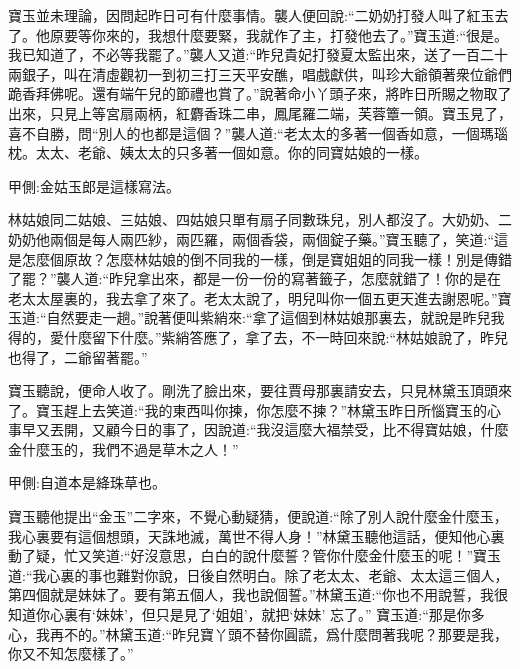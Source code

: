 \begin{parag}
    寶玉並未理論，因問起昨日可有什麼事情。襲人便回說:“二奶奶打發人叫了紅玉去了。他原要等你來的，我想什麼要緊，我就作了主，打發他去了。”寶玉道:“很是。我已知道了，不必等我罷了。”襲人又道:“昨兒貴妃打發夏太監出來，送了一百二十兩銀子，叫在清虛觀初一到初三打三天平安醮，唱戲獻供，叫珍大爺領著衆位爺們跪香拜佛呢。還有端午兒的節禮也賞了。”說著命小丫頭子來，將昨日所賜之物取了出來，只見上等宮扇兩柄，紅麝香珠二串，鳳尾羅二端，芙蓉簟一領。寶玉見了，喜不自勝，問“別人的也都是這個？”襲人道:“老太太的多著一個香如意，一個瑪瑙枕。太太、老爺、姨太太的只多著一個如意。你的同寶姑娘的一樣。\begin{note}甲側:金姑玉郎是這樣寫法。\end{note}林姑娘同二姑娘、三姑娘、四姑娘只單有扇子同數珠兒，別人都沒了。大奶奶、二奶奶他兩個是每人兩匹紗，兩匹羅，兩個香袋，兩個錠子藥。”寶玉聽了，笑道:“這是怎麼個原故？怎麼林姑娘的倒不同我的一樣，倒是寶姐姐的同我一樣！別是傳錯了罷？”襲人道:“昨兒拿出來，都是一份一份的寫著籤子，怎麼就錯了！你的是在老太太屋裏的，我去拿了來了。老太太說了，明兒叫你一個五更天進去謝恩呢。”寶玉道:“自然要走一趟。”說著便叫紫綃來:“拿了這個到林姑娘那裏去，就說是昨兒我得的，愛什麼留下什麼。”紫綃答應了，拿了去，不一時回來說:“林姑娘說了，昨兒也得了，二爺留著罷。”
\end{parag}


\begin{parag}
    寶玉聽說，便命人收了。剛洗了臉出來，要往賈母那裏請安去，只見林黛玉頂頭來了。寶玉趕上去笑道:“我的東西叫你揀，你怎麼不揀？”林黛玉昨日所惱寶玉的心事早又丟開，又顧今日的事了，因說道:“我沒這麼大福禁受，比不得寶姑娘，什麼金什麼玉的，我們不過是草木之人！”\begin{note}甲側:自道本是絳珠草也。\end{note}寶玉聽他提出“金玉”二字來，不覺心動疑猜，便說道:“除了別人說什麼金什麼玉，我心裏要有這個想頭，天誅地滅，萬世不得人身！”林黛玉聽他這話，便知他心裏動了疑，忙又笑道:“好沒意思，白白的說什麼誓？管你什麼金什麼玉的呢！”寶玉道:“我心裏的事也難對你說，日後自然明白。除了老太太、老爺、太太這三個人，第四個就是妹妹了。要有第五個人，我也說個誓。”林黛玉道:“你也不用說誓，我很知道你心裏有‘妹妹’，但只是見了‘姐姐’，就把‘妹妹’ 忘了。” 寶玉道:“那是你多心，我再不的。”林黛玉道:“昨兒寶丫頭不替你圓謊，爲什麼問著我呢？那要是我，你又不知怎麼樣了。”
\end{parag}


